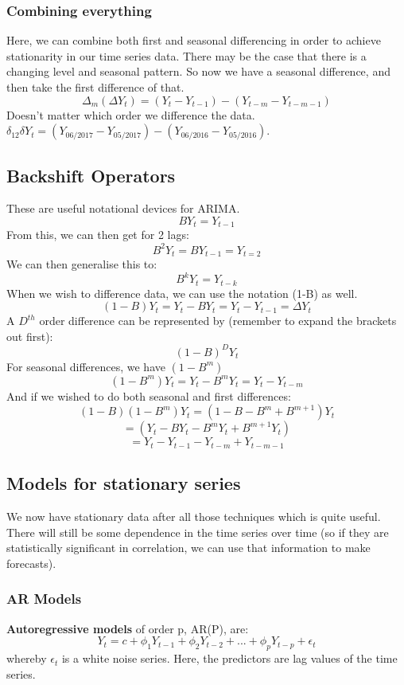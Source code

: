 \documentclass[11pt, oneside]{article}
\theoremstyle{definition}
\begin{document}
 \subsubsection{Combining everything}
 Here, we can combine both first and seasonal differencing in order to achieve stationarity in our time series data. There may be the case that there is a changing level and seasonal pattern. So now we have a seasonal difference, and then take the first difference of that.
 $$
\Delta_m(\Delta Y_t) = (Y_t - Y_{t-1}) - (Y_{t-m} - Y_{t-m-1})
 $$
 Doesn't matter which order we difference the data. $\delta_{12} \delta Y_t = (Y_{06/2017} - Y_{05/2017}) - (Y_{06/2016} - Y_{05/2016})$.

\subsection{Backshift Operators}
These are useful notational devices for ARIMA.
$$
BY_t = Y_{t-1}
$$
From this, we can then get for 2 lags:
$$
B^2Y_t = BY_{t-1} = Y_{t=2}
$$
We can then generalise this to:
$$
B^kY_t = Y_{t-k}
$$
When we wish to difference data, we can use the notation (1-B) as well.
$$
(1-B)Y_t = Y_t - BY_t = Y_t - Y_{t-1} = \Delta Y_t
$$
A $D^{th}$ order difference can be represented by (remember to expand the brackets out first):
$$
(1-B)^DY_t
$$
For seasonal differences, we have $(1 - B^m)$
$$
(1 - B^m)Y_t = Y_t - B^mY_t = Y_t - Y_{t-m}
$$
And if we wished to do both seasonal and first differences:
$$
(1 - B)(1 - B^m)Y_t = (1 - B - B^m + B^{m+1})Y_t
$$
$$
= (Y_t - BY_t - B^mY_t + B^{m+1}Y_t)
$$
$$
= Y_t - Y_{t-1} - Y_{t-m} + Y_{t-m-1}
$$
\subsection{Models for stationary series}
We now have stationary data after all those techniques which is quite useful. There will still be some dependence in the time series over time (so if they are statistically significant in correlation, we can use that information to make forecasts).

\subsubsection{AR Models}
\textbf{Autoregressive models} of order p, AR(P), are:
$$
Y_t = c + \phi_1Y_{t-1} + \phi_2Y_{t-2} + ... + \phi_pY_{t-p} + \epsilon_t
$$
whereby $\epsilon_t$ is a white noise series. Here, the predictors are lag values of the time series.
\end{document}
